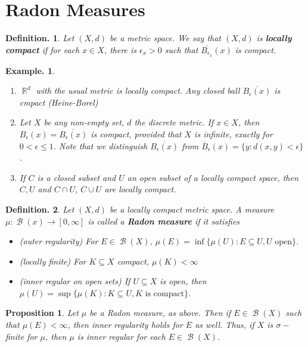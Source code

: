 \documentclass[12pt, a4paper]{memoir}
\DeclareMathOperator{\R}{{\mathbb{R}}}
\newtheorem{proposition}[theorem]{Proposition}
\theoremstyle{nonumberplain}
\newtheorem{definition}{Definition.}
\newtheorem{example}{Example.}
\DeclareMathOperator{\B}{\mathcal{B}}
\begin{document}
\section{Radon Measures}
\begin{definition}
    Let $(X,d)$ be a metric space.
    We say that $(X,d)$ is \textbf{locally compact} if for each $x\in X$, there is $\epsilon_x>0$ such that $\overline{B_{\epsilon_x}}(x)$ is compact.
\end{definition}
\begin{example}
    \begin{enumerate}[label=(\roman*)]
        \item $\R^d$ with the usual metric is locally compact.
            Any closed ball $\overline{B_\epsilon(x)}$ is cmpact (Heine-Borel)
        \item Let $X$ be any non-empty set, $d$ the discrete metric.
            If $x\in X$, then $B_\epsilon(x)=\overline{B_\epsilon(x)}$ is compact, provided that $X$ is infinite, exactly for $0<\epsilon\leq 1$.
            Note that we distinguish $\overline{B_{\epsilon}(x)}$ from $\overline{B}_\epsilon(x)=\{y:d(x,y)<\epsilon\}$.
        \item If $C$ is a closed subset and $U$ an open subset of a locally compact space, then $C,U$ and $C\cap U$, $C\cup U$ are locally compact.
    \end{enumerate}
\end{example}
\begin{definition}
    Let $(X,d)$ be a locally compact metric space.
    A measure $\mu:\B(x)\to[0,\infty]$ is called a \textbf{Radon measure} if it satisfies
    \begin{itemize}[nolistsep]
        \item \textit{(outer regularity)} For $E\in\B(X)$, $\mu(E)=\inf\{\mu(U):E\subseteq U, U\text{ open}\}$.
        \item \textit{(locally finite)} For $K\subseteq X$ compact, $\mu(K)<\infty$
        \item \textit{(inner regular on open sets)} If $U\subseteq X$ is open, then $\mu(U)=\sup\{\mu(K):K\subseteq U, K\text{ is compact}\}$.
    \end{itemize}
\end{definition}
\begin{proposition}
    Let $\mu$ be a Radon measure, as above.
    Then if $E\in\B(X)$ such that $\mu(E)<\infty$, then inner regularity holds for $E$ as well.
    Thus, if $X$ is $\sigma-$finite for $\mu$, then $\mu$ is inner regular for each $E\in\B(X)$.
\end{proposition}
\end{document}
